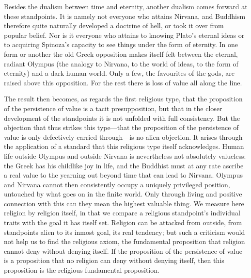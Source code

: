 \documentclass[12pt,a4paper]{book}
\newcommand{\opage}[1]{\marginnote{\footnotesize\textit{[#1]}}}
\begin{document}
Besides the dualism between time and eternity, another dualism comes forward at these standpoints. It is
namely not everyone who attains Nirvana, and Buddhism therefore quite naturally developed a doctrine of
hell, or took it over from popular belief. Nor is it everyone who attains to knowing Plato's eternal ideas
or to acquiring Spinoza's capacity to see things under the form of eternity. In one form or another the
old Greek opposition makes itself felt between the eternal, radiant Olympus (the analogy to Nirvana, to the
world of ideas, to the form of eternity) and 
\opage{158}a dark human world. Only a few, the favourites of the gods,
are raised above this opposition. For the rest there is loss of value all along the line.

The result then becomes, as regards the first religious type, that the proposition of the persistence of
value is a tacit presupposition, but that in the closer development of the standpoints it is not unfolded
with full consistency. But the objection that thus strikes this type---that the proposition of the
persistence of value is only defectively carried through---is no alien objection. It arises through the
application of a standard that this religious type itself acknowledges. Human life outside Olympus and
outside Nirvana is nevertheless not absolutely valueless: the Greek has his childlike joy in life, and the
Buddhist must at any rate ascribe a real value to the yearning out beyond time that can lead to Nirvana.
Olympus and Nirvana cannot then consistently occupy a uniquely privileged position, untouched by what goes
on in the finite world. Only through living and positive connection with this can they mean the highest
valuable thing. We measure here religion by religion itself, in that we compare a religious standpoint's
individual traits with the goal it has itself set. Religion can be attacked from outside, from standpoints
alien to its inmost goal, its real tendency; but such a criticism would not help us to find the religious
axiom, the fundamental proposition that religion cannot deny without denying itself. If the proposition of
the persistence of value is a proposition that no religion can deny without denying itself, then this
proposition is the religious fundamental proposition.

\medskip
\end{document}
